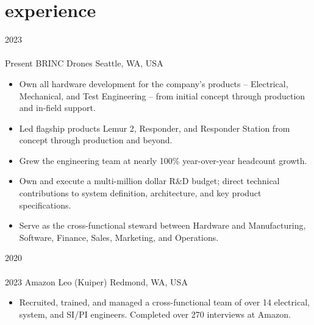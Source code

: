 
\section{experience}

\begin{entrylist}
\entry
  {2023\\\faChevronDown\\Present}
  {BRINC Drones}
  {Seattle, WA, USA}
  {
\begin{itemize}[leftmargin=12pt]
  \item Own all hardware development for the company's products -- Electrical, Mechanical, and Test Engineering -- from initial concept through production and in-field support.
  \item Led flagship products Lemur 2, Responder, and Responder Station from concept through production and beyond.
  \item Grew the engineering team at nearly 100\% year-over-year headcount growth.
  \item Own and execute a multi-million dollar R\&D budget; direct technical contributions to system definition, architecture, and key product specifications.
  \item Serve as the cross-functional steward between Hardware and Manufacturing, Software, Finance, Sales, Marketing, and Operations.
\end{itemize}
}
\entry
  {2020\\\faChevronDown\\2023}
  {Amazon Leo (Kuiper)}
  {Redmond, WA, USA}
  {
\begin{itemize}[leftmargin=12pt]
  \item Recruited, trained, and managed a cross-functional team of over 14 electrical, system, and SI/PI engineers. Completed over 270 interviews at Amazon.

\end{itemize}}
\end{entrylist}

